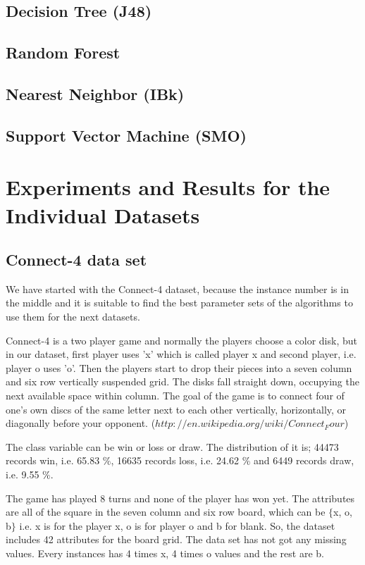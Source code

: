 \documentclass[a4paper]{article}
\begin{document}
    \subsection{ Decision Tree (J48)}
    \subsection{ Random Forest}
    \subsection{ Nearest Neighbor (IBk)}
    \subsection{ Support Vector Machine (SMO)}

\section{Experiments and Results for the Individual Datasets}

\subsection{Connect-4 data set}

We have started with the Connect-4 dataset, because the instance number is in the middle and it is suitable to find the best parameter sets of the algorithms to use them for the next datasets.

Connect-4 is a two player game and normally the players choose a color disk, but in our dataset, first player uses 'x' which is called player x and second player, i.e. player o uses 'o'. Then the players start to drop their pieces into a seven column and six row vertically suspended grid. The disks fall straight down, occupying the next available space within column. The goal of the game is to connect four of one's own discs of the same letter next to each other vertically, horizontally, or diagonally before your opponent. ($http://en.wikipedia.org/wiki/Connect_Four$) 

The class variable can be win or loss or draw. The distribution of it is; 44473 records win, i.e. 65.83 $\%$, 16635 records loss,  i.e. 24.62 $\%$ and 6449 records draw,  i.e. 9.55 $\%$.

The game has played 8 turns and none of the player has won yet. The attributes are all of the square in the seven column and six row board, which can be $\{$x, o, b$\}$ i.e. x is for the player x, o is for player o and b for blank. So, the dataset includes 42 attributes for the board grid. The data set has not got any missing values. Every instances has 4 times x, 4 times o values and the rest are b. 
\end{document}
